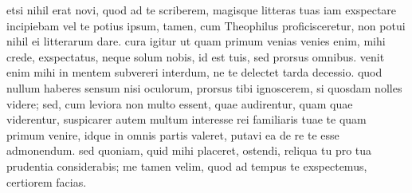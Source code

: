


 etsi nihil erat novi, quod ad te scriberem, magisque litteras tuas iam exspectare incipiebam vel te potius ipsum, tamen, cum Theophilus proficisceretur, non potui nihil ei litterarum dare. cura igitur ut quam primum venias venies enim, mihi crede, exspectatus, neque solum nobis, id est tuis, sed prorsus omnibus. venit enim mihi in mentem subvereri interdum, ne te delectet tarda decessio. quod nullum haberes sensum nisi oculorum, prorsus tibi ignoscerem, si quosdam nolles videre; sed, cum leviora non multo essent, quae audirentur, quam quae viderentur, suspicarer autem multum interesse rei familiaris tuae te quam primum venire, idque in omnis partis valeret, putavi ea de re te esse admonendum. sed quoniam, quid mihi placeret, ostendi, reliqua tu pro tua prudentia considerabis; me tamen velim, quod ad tempus te exspectemus, certiorem facias.

